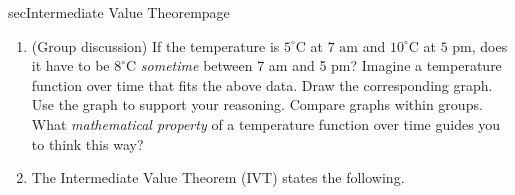 \documentclass[../main]{subfiles}
\begin{document}
\begin{outline}{sec}{Intermediate Value Theorem}{page}
  \label{act:ivt}

  \begin{enumerate}
    \item[\faIcon{comments}] (Group discussion) \label{part:ivt-example} If the temperature is \(5^{\circ}\)C at \(7 \text{ am}\) and \({10}^{\circ}\)C at \(5\text{ pm}\), does it have to be \({8}^{\circ}\)C \emph{sometime} between 7 am and 5 pm?  Imagine a temperature function over time that fits the above data. Draw the corresponding graph. Use the graph to support your reasoning. Compare graphs within groups. What \emph{mathematical property} of a temperature function over time guides you to think this way?
          \begin{figure}[H]
            \centering
          \end{figure}

    \item The Intermediate Value Theorem (IVT) states the following.


\end{enumerate}
\end{outline}
\end{document}
